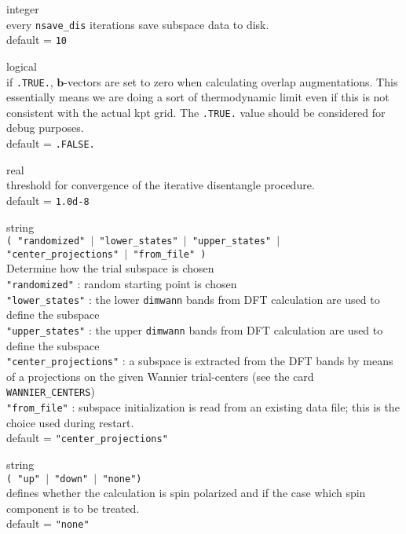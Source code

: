 {\noindent{}%
{\sc integer} \\  every {\tt nsave\_dis} iterations save subspace data to disk.\\
{\sc default} = {\tt 10} \par

\noindent{}%
{\sc logical} \\   if {\tt .TRUE.}, $\mathbf{b}$-vectors are set to zero
when calculating overlap augmentations.
This essentially means we are doing a sort of thermodynamic limit
even if this is not consistent with the actual kpt grid. The {\tt .TRUE.} value
should be considered for debug purposes.\\ {\sc default} = {\tt .FALSE.} \par

\noindent{}%
{\sc real} \\  threshold for convergence of the iterative disentangle procedure.\\
{\sc default} = {\tt 1.0d-8} \par

\noindent{}%
{\sc string} \\  {\tt ( "randomized" $\mid$ "lower\_states" $\mid$ "upper\_states" $\mid$ \\
"center\_projections" $\mid$ "from\_file" ) }\\
Determine how the trial subspace is chosen\\
{\tt "randomized"}   : random starting point is chosen\\
{\tt "lower\_states"} : the lower {\tt dimwann} bands from DFT calculation are
                 used to define the subspace\\
{\tt "upper\_states"} : the upper {\tt dimwann} bands from DFT calculation are
                 used to define the subspace\\
{\tt "center\_projections"} : a subspace is extracted from the DFT bands
                 by means of a projections on the given Wannier trial-centers
                 (see the card {\tt WANNIER\_CENTERS})\\
{\tt "from\_file"} : subspace initialization is read from an existing data file;
                 this is the choice used during restart.\\
{\sc default} = {\tt "center\_projections"} \par

\noindent{}%
{\sc string} \\  {\tt ( "up" $\mid$ "down" $\mid$ "none")}\\
defines whether the calculation is spin polarized and if the case
which spin component is to be treated.\\
{\sc default} = {\tt "none"} \par
}\bigskip

